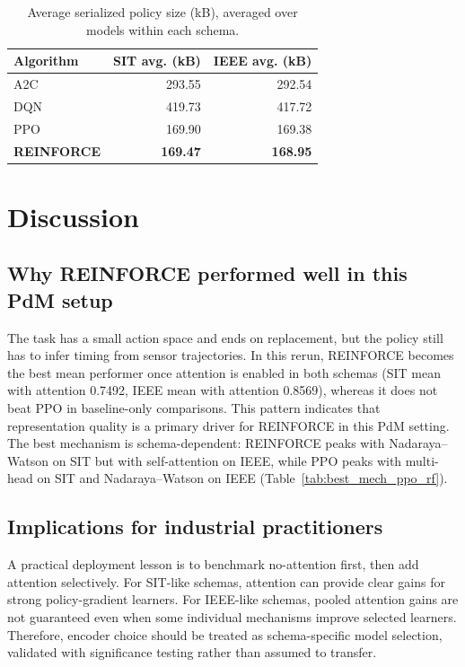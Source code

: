 \documentclass[sn-basic]{sn-jnl}%
\begin{document}
\begin{table}[htbp]
\centering
\caption{Average serialized policy size (kB), averaged over models within each schema.}
\label{tab:model_size_summary}
\begin{tabular}{l r r}
\toprule
	\textbf{Algorithm} & \textbf{SIT avg. (kB)} & \textbf{IEEE avg. (kB)}\\
	\midrule
	A2C & 293.55 & 292.54\\
	DQN & 419.73 & 417.72\\
	PPO & 169.90 & 169.38\\
	\textbf{REINFORCE} & \textbf{169.47} & \textbf{168.95}\\
\bottomrule
\end{tabular}
\end{table}

\section{Discussion}
\label{sec:discussion}
\subsection{Why REINFORCE performed well in this PdM setup}
The task has a small action space and ends on replacement, but the policy still has to infer timing from sensor trajectories. In this rerun, \textsc{REINFORCE} becomes the best mean performer once attention is enabled in both schemas (SIT mean with attention 0.7492, IEEE mean with attention 0.8569), whereas it does not beat \textsc{PPO} in baseline-only comparisons. This pattern indicates that representation quality is a primary driver for \textsc{REINFORCE} in this PdM setting.
The best mechanism is schema-dependent: \textsc{REINFORCE} peaks with Nadaraya--Watson on SIT but with self-attention on IEEE, while \textsc{PPO} peaks with multi-head on SIT and Nadaraya--Watson on IEEE (Table~\ref{tab:best_mech_ppo_rf}).

\subsection{Implications for industrial practitioners}
A practical deployment lesson is to benchmark no-attention first, then add attention selectively. For SIT-like schemas, attention can provide clear gains for strong policy-gradient learners. For IEEE-like schemas, pooled attention gains are not guaranteed even when some individual mechanisms improve selected learners. Therefore, encoder choice should be treated as schema-specific model selection, validated with significance testing rather than assumed to transfer.
\end{document}
